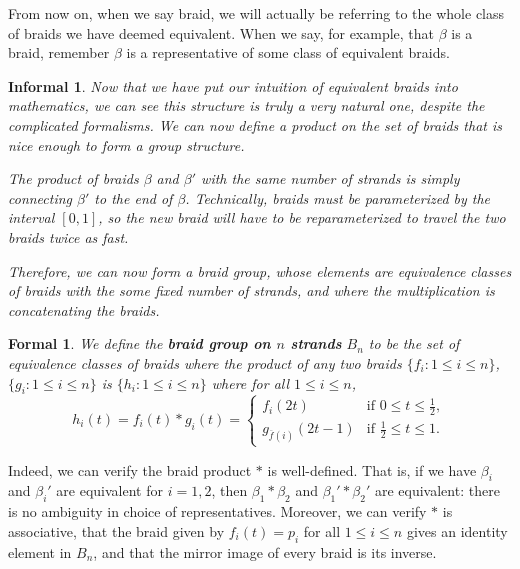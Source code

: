 \documentclass{amsart}
\newtheorem*{formal}{Formal}
\newtheorem*{informal}{Informal}
\begin{document}
From now on, when we say braid, we will actually
be referring to the whole class of braids we have deemed equivalent. When we
say, for example, that \(\beta\) is a braid, remember \(\beta\) is a
representative of some class of equivalent braids.


\begin{definition}\label{braidgroup}
	\begin{informal}
	   Now that we have put our intuition of equivalent braids into mathematics,
		we can see this structure is truly a very natural one, despite the
		complicated formalisms. We can now define a product on the set of braids
		that is nice enough to form a group structure. 

		The product of braids \(\beta\) and \(\beta'\) with the same number of
		strands is simply	connecting \(\beta'\) to the end of \(\beta\).
		Technically, braids must be parameterized by the interval \([0, 1]\), so
		the new braid will have	to be reparameterized to travel the two braids
		twice as fast.

		Therefore, we can now form a \emph{braid group}, whose elements are
		equivalence classes of braids with the some fixed number of strands, and
		where the multiplication is concatenating the braids.
	\end{informal}

	\begin{formal}
	   We define the \textbf{braid group on \(n\) strands} \(B_n\) to be the set of
		equivalence classes of braids where the product of any two braids
		\(\{f_i : 1\le i\le n\}\), \(\{g_i : 1\le i\le n\}\) is \(\{h_i: 1\le i\le
		n\}\) where for all \(1\le i\le n\), 
		\[
			h_i(t) = f_i(t)\ast g_i(t) = 
			\begin{cases}
				f_i(2t)&\text{if }0\le t\le \frac{1}{2},\\
				g_{\overline{f}(i)}(2t-1)&\text{if }\frac{1}{2}\le t\le 1.
			\end{cases}
		\] 
	\end{formal}
\end{definition}
Indeed, we can verify the braid product \(\ast\) is well-defined. That is,
if we have \(\beta_i\) and \(\beta_i'\) are equivalent for \(i = 1, 2\), then
\(\beta_1\ast\beta_2\) and \(\beta_1'\ast\beta_2'\) are equivalent: there is no
ambiguity in choice of representatives. Moreover, we can verify \(\ast\) is
associative, that the braid given by \(f_i(t) = p_i\) for all \(1\le i\le n\)
gives an identity element in \(B_n\), and that the mirror image of every braid
is its inverse.
\end{document}
